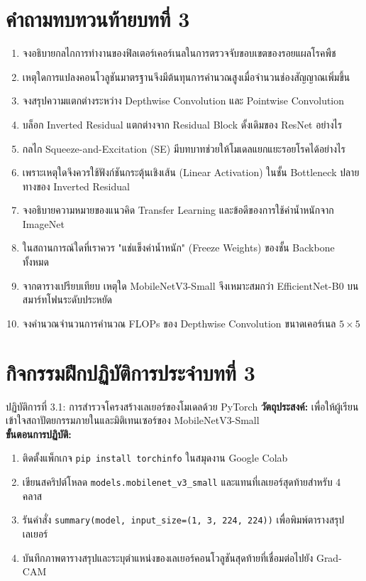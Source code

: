 \section*{คำถามทบทวนท้ายบทที่ 3}
\begin{enumerate}[leftmargin=1.8em, itemsep=4pt]
    \item จงอธิบายกลไกการทำงานของฟิลเตอร์เคอร์เนลในการตรวจจับขอบเขตของรอยแผลโรคพืช
    \item เหตุใดการแปลงคอนโวลูชันมาตรฐานจึงมีต้นทุนการคำนวณสูงเมื่อจำนวนช่องสัญญาณเพิ่มขึ้น
    \item จงสรุปความแตกต่างระหว่าง Depthwise Convolution และ Pointwise Convolution
    \item บล็อก Inverted Residual แตกต่างจาก Residual Block ดั้งเดิมของ ResNet อย่างไร
    \item กลไก Squeeze-and-Excitation (SE) มีบทบาทช่วยให้โมเดลแยกแยะรอยโรคได้อย่างไร
    \item เพราะเหตุใดจึงควรใช้ฟังก์ชันกระตุ้นเชิงเส้น (Linear Activation) ในชั้น Bottleneck ปลายทางของ Inverted Residual
    \item จงอธิบายความหมายของแนวคิด Transfer Learning และข้อดีของการใช้ค่าน้ำหนักจาก ImageNet
    \item ในสถานการณ์ใดที่เราควร "แช่แข็งค่าน้ำหนัก" (Freeze Weights) ของชั้น Backbone ทั้งหมด
    \item จากตารางเปรียบเทียบ เหตุใด MobileNetV3-Small จึงเหมาะสมกว่า EfficientNet-B0 บนสมาร์ทโฟนระดับประหยัด
    \item จงคำนวณจำนวนการคำนวณ FLOPs ของ Depthwise Convolution ขนาดเคอร์เนล $5 \times 5$
\end{enumerate}

\section*{กิจกรรมฝึกปฏิบัติการประจำบทที่ 3}
\begin{nocodebox}{ปฏิบัติการที่ 3.1: การสำรวจโครงสร้างเลเยอร์ของโมเดลด้วย PyTorch}
\textbf{วัตถุประสงค์:} เพื่อให้ผู้เรียนเข้าใจสถาปัตยกรรมภายในและมิติเทนเซอร์ของ MobileNetV3-Small\\
\textbf{ขั้นตอนการปฏิบัติ:}
\begin{enumerate}[leftmargin=1.4em, itemsep=2pt]
    \item ติดตั้งแพ็กเกจ \texttt{pip install torchinfo} ในสมุดงาน Google Colab
    \item เขียนสคริปต์โหลด \texttt{models.mobilenet\_v3\_small} และแทนที่เลเยอร์สุดท้ายสำหรับ 4 คลาส
    \item รันคำสั่ง \texttt{summary(model, input\_size=(1, 3, 224, 224))} เพื่อพิมพ์ตารางสรุปเลเยอร์
    \item บันทึกภาพตารางสรุปและระบุตำแหน่งของเลเยอร์คอนโวลูชันสุดท้ายที่เชื่อมต่อไปยัง Grad-CAM
\end{enumerate}
\end{nocodebox}

